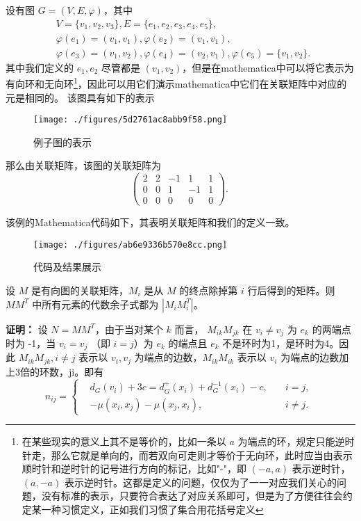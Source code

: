 \begin{example}{}
设有图 $G=(V,E,\varphi)$，其中
 \begin{equation}
 \begin{aligned}
  &V=\{v_1,v_2,v_3\},E=\{e_1,e_2,e_3,e_4,e_5\},\\
 &\varphi(e_1)=(v_1,v_1), \varphi(e_2)=(v_1,v_1), \\
 &\varphi(e_3)=(v_1,v_2), \varphi(e_4)=(v_2,v_1),\varphi(e_5)=\{v_1,v_2\}.
 \end{aligned}~
 \end{equation}
 其中我们定义的 $e_1,e_2$ 尽管都是 $(v_1,v_2)$，但是在mathematica中可以将它表示为有向环和无向环\footnote{在某些现实的意义上其不是等价的，比如一条以 $a$ 为端点的环，规定只能逆时针走，那么它就是单向的，而若双向可走则才等价于无向环，此时应当由表示顺时针和逆时针的记号进行方向的标记，比如"-"，即 $(-a,a)$ 表示逆时针，$(a,-a)$ 表示逆时针。这都是定义的问题，仅仅为了一一对应我们关心的问题，没有标准的表示，只要符合表达了对应关系即可，但是为了方便往往会约定某一种习惯定义，正如我们习惯了集合用花括号定义}，因此可以用它们演示mathematica中它们在关联矩阵中对应的元是相同的。
 该图具有如下的表示
\begin{figure}[ht]
\centering
\texttt{[image: ./figures/5d2761ac8abb9f58.png]}
\caption{例子图的表示} \label{fig_RepGra_2}
\end{figure} 
那么由关联矩阵，该图的关联矩阵为
\begin{equation}
\begin{pmatrix}
2&2&-1&1&1\\
0&0&1&-1&1\\
0&0&0&0&0
\end{pmatrix}.~
\end{equation}

该例的Mathematica代码如下，其表明关联矩阵和我们的定义一致。
\begin{figure}[ht]
\centering
\texttt{[image: ./figures/ab6e9336b570e8cc.png]}
\caption{代码及结果展示} \label{fig_RepGra_1}
\end{figure}

\end{example}

\begin{theorem}{}
设 $M$ 是有向图的关联矩阵，$M_i$ 是从 $M$ 的终点除掉第 $i$ 行后得到的矩阵。则 $MM^T$ 中所有元素的代数余子式都为 $|M_iM_i^T|$。

\end{theorem}
\textbf{证明：}
设 $N=MM^T$，由于当对某个 $k$ 而言， $M_{ik}M_{jk}$ 在 $v_i\neq v_j$ 为 $e_k$ 的两端点时为 -1，当 $v_i=v_j$ （即 $i=j$）为 $e_k$ 的端点且 $e_k$ 不是环时为1，是环时为4。因此 $M_{ik}M_{jk},i\neq j$ 表示以 $v_i,v_j$ 为端点的边数，$M_{ik}M_{ik}$ 表示以 $v_i$ 为端点的边数加上3倍的环数，ji。即有
\begin{equation}
n_{ij}=\left\{\begin{aligned}
&d_G(v_i)+3c=d_G^+(x_i)+d_G^{-1}(x_i)-c,\quad &i=j,\\
&-\mu(x_i,x_j)-\mu(x_j,x_i),\quad &i\neq j.
\end{aligned}\right.~
\end{equation}


